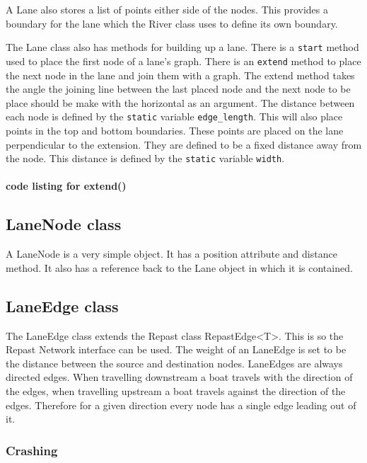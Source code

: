 A Lane also stores a list of points either side of the nodes. This
provides a boundary for the lane which the River class uses to define
its own boundary.

The Lane class also has methods for building up a lane. There is a
\texttt{start} method used to place the first node of a lane's
graph. There is an \texttt{extend} method to place the next node in
the lane and join them with a graph. The extend method takes the angle
the joining line between the last placed node and the next node to be
place should be make with the horizontal as an argument. The distance
between each node is defined by the \texttt{static} variable
\texttt{edge\_length}. This will also place points in the top and
bottom boundaries. These points are placed on the lane perpendicular
to the extension. They are defined to be a fixed distance away from
the node. This distance is defined by the \texttt{static} variable
\texttt{width}.

\paragraph{code listing for extend()}


\subsection{LaneNode class}
A LaneNode is a very simple object. It has a position attribute and
distance method. It also has a reference back to the Lane object in
which it is contained.
\subsection{LaneEdge class}
The LaneEdge class extends the Repast class RepastEdge<T>. This is so
the Repast Network interface can be used. The weight of an LaneEdge is
set to be the distance between the source and destination
nodes. LaneEdges are always directed edges. When travelling downstream
a boat travels with the direction of the edges, when travelling
upstream a boat travels against the direction of the edges. Therefore
for a given direction every node has a single edge leading out of it.

\subsubsection{Crashing}

